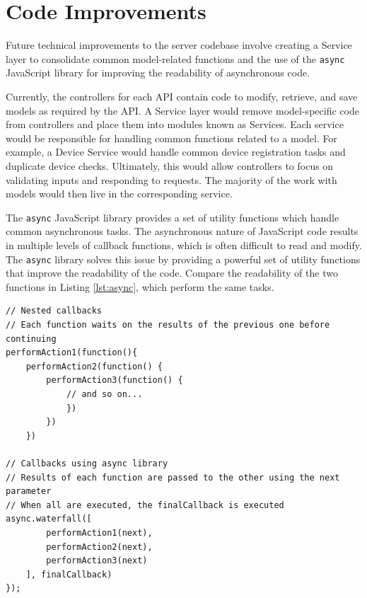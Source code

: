 \section{Code Improvements}

Future technical improvements to the server codebase involve creating a Service layer to consolidate common model-related functions and the use of the \texttt{async} JavaScript library for improving the readability of asynchronous code. 

Currently, the controllers for each API contain code to modify, retrieve, and save models as required by the API. A Service layer would remove model-specific code from controllers and place them into modules known as Services. Each service would be responsible for handling common functions related to a model. For example, a Device Service would handle common device registration tasks and duplicate device checks. Ultimately, this would allow controllers to focus on validating inputs and responding to requests. The majority of the work with models would then live in the corresponding service.

The \texttt{async} JavaScript library provides a set of utility functions which handle common asynchronous tasks. The asynchronous nature of JavaScript code results in multiple levels of callback functions, which is often difficult to read and modify. The \texttt{async} library solves this issue by providing a powerful set of utility functions that improve the readability of the code. Compare the readability of the two functions in Listing \ref{lst:async}, which perform the same tasks. 

\medskip
\begin{lstlisting}[caption={[Typical Nested Code vs \texttt{async} library]Comparison between normal callback code and \texttt{async} code}, label={lst:async}]
// Nested callbacks
// Each function waits on the results of the previous one before continuing
performAction1(function(){
	performAction2(function() {
		performAction3(function() {
			// and so on...
			})
		})
	})

// Callbacks using async library
// Results of each function are passed to the other using the next parameter
// When all are executed, the finalCallback is executed
async.waterfall([
		performAction1(next), 
		performAction2(next),
		performAction3(next)
	], finalCallback)
});
\end{lstlisting}









